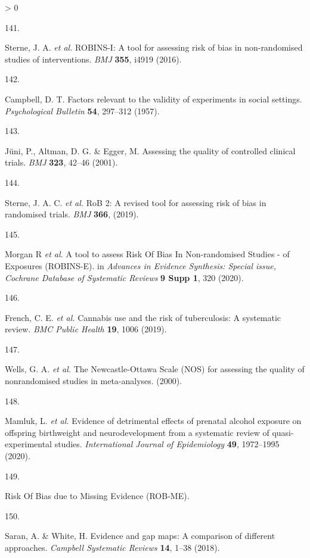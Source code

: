 \documentclass[a4paper, twoside]{templates/ociamthesis}
\newlength{\cslhangindent}
\newlength{\csllabelwidth}
\newenvironment{CSLReferences}[3] %
 {%
  \setlength{\parindent}{0pt}
  \ifodd #1 \everypar{\setlength{\hangindent}{\cslhangindent}}\ignorespaces\fi
  \ifnum #2 > 0
  \setlength{\parskip}{#2\baselineskip}
  \fi
 }%
 {}
\newcommand{\CSLLeftMargin}[1]{\parbox[t]{\maxof{\widthof{#1}}{\csllabelwidth}}{#1}}
\newcommand{\CSLRightInline}[1]{\parbox[t]{\linewidth - \csllabelwidth}{#1}}
\begin{document}
\begin{CSLReferences}{0}{0}
\leavevmode\hypertarget{ref-sterne2016}{}%
\CSLLeftMargin{141. }
\CSLRightInline{Sterne, J. A. \emph{et al.} {ROBINS}-{I}: A tool for assessing risk of bias in non-randomised studies of interventions. \emph{BMJ} \textbf{355}, i4919 (2016).}

\leavevmode\hypertarget{ref-campbell1957}{}%
\CSLLeftMargin{142. }
\CSLRightInline{Campbell, D. T. Factors relevant to the validity of experiments in social settings. \emph{Psychological Bulletin} \textbf{54}, 297--312 (1957).}

\leavevmode\hypertarget{ref-juni2001}{}%
\CSLLeftMargin{143. }
\CSLRightInline{Jüni, P., Altman, D. G. \& Egger, M. Assessing the quality of controlled clinical trials. \emph{BMJ} \textbf{323}, 42--46 (2001).}

\leavevmode\hypertarget{ref-sterne2019}{}%
\CSLLeftMargin{144. }
\CSLRightInline{Sterne, J. A. C. \emph{et al.} {RoB} 2: A revised tool for assessing risk of bias in randomised trials. \emph{BMJ} \textbf{366}, (2019).}

\leavevmode\hypertarget{ref-morganr2020}{}%
\CSLLeftMargin{145. }
\CSLRightInline{Morgan R \emph{et al.} A tool to assess {Risk Of Bias In Non}-randomised {Studies} - of {Exposures} ({ROBINS}-{E}). in \emph{Advances in {Evidence Synthesis}: Special issue, {Cochrane Database} of {Systematic Reviews}} \textbf{9 Supp 1}, 320 (2020).}

\leavevmode\hypertarget{ref-french2019}{}%
\CSLLeftMargin{146. }
\CSLRightInline{French, C. E. \emph{et al.} Cannabis use and the risk of tuberculosis: A systematic review. \emph{BMC Public Health} \textbf{19}, 1006 (2019).}

\leavevmode\hypertarget{ref-wells2000}{}%
\CSLLeftMargin{147. }
\CSLRightInline{Wells, G. A. \emph{et al.} The {Newcastle}-{Ottawa Scale} ({NOS}) for assessing the quality of nonrandomised studies in meta-analyses. (2000).}

\leavevmode\hypertarget{ref-mamluk2020}{}%
\CSLLeftMargin{148. }
\CSLRightInline{Mamluk, L. \emph{et al.} Evidence of detrimental effects of prenatal alcohol exposure on offspring birthweight and neurodevelopment from a systematic review of quasi-experimental studies. \emph{International Journal of Epidemiology} \textbf{49}, 1972--1995 (2020).}

\leavevmode\hypertarget{ref-zotero-15123}{}%
\CSLLeftMargin{149. }
\CSLRightInline{Risk {Of Bias} due to {Missing Evidence} ({ROB}-{ME}).}

\leavevmode\hypertarget{ref-saran2018}{}%
\CSLLeftMargin{150. }
\CSLRightInline{Saran, A. \& White, H. Evidence and gap maps: A comparison of different approaches. \emph{Campbell Systematic Reviews} \textbf{14}, 1--38 (2018).}


\end{CSLReferences}
\end{document}
